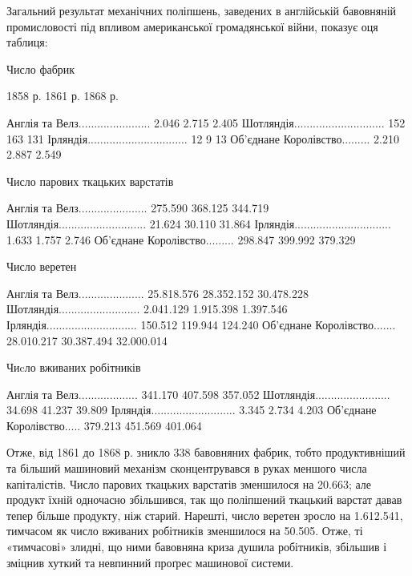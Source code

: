 Загальний результат механічних поліпшень, заведених в англійській
бавовняній промисловості під впливом американської
громадянської війни, показує оця таблиця:

Число фабрик

                                                                      1858 р.
1861 р.                1868 р.

Англія та Велз.......................                   2.046                          2.715
          2.405
Шотляндія.............................                   152                               163
                131
Ірляндія................................                     12                                    9
                        13
Об’єднане Королівство.........                 2.210                            2.887
   2.549

Число парових ткацьких  варстатів

Англія та Велз......................              275.590                        368.125
  344.719
Шотляндія............................               21.624                          30.110
       31.864
Ірляндія...............................                  1.633                            1.757
              2.746
Об’єднане Королівство.........             298.847                        399.992
379.329

Число веретен

Англія та Велз.....................       25.818.576                    28.352.152
30.478.228
Шотляндія..........................          2.041.129                      1.915.398
1.397.546
Ірляндія.............................              150.512                         119.944
      124.240
Об’єднане Королівство.......        28.010.217                    30.387.494            32.000.014

Чиcло вживаних робітників

Англія та Велз...................               341.170                          407.598
    357.052
Шотляндія........................                  34.698                            41.237
        39.809
Ірляндія...........................                     3.345                              2.734
               4.203
Об’єднане Королівство.....               379.213                           451.569
401.064

Отже, від 1861 до 1868 р. зникло 338 бавовняних фабрик, тобто
продуктивніший та більший машиновий механізм сконцентрувався
в руках меншого числа капіталістів. Число парових ткацьких
варстатів зменшилося на 20.663; але продукт їхній одночасно
збільшився, так що поліпшений ткацький варстат давав
тепер більше продукту, ніж старий. Нарешті, число веретен
зросло на 1.612.541, тимчасом як число вживаних робітників
зменшилося на 50.505. Отже, ті «тимчасові» злидні, що ними бавовняна
криза душила робітників, збільшив і зміцнив хуткий
та невпинний проґрес машинової системи.


